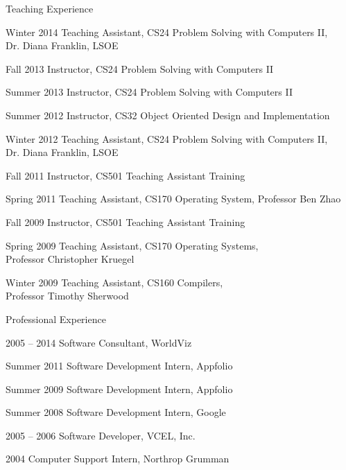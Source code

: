 \begin{vitae}
{\begin{vitaesection}{Teaching Experience}
\vspace{-0.1cm}
  \item [Winter 2014] Teaching Assistant, CS24 Problem Solving with Computers
    II,\\ Dr. Diana Franklin, LSOE
  \item [Fall 2013] Instructor, CS24 Problem Solving with Computers II
  \item [Summer 2013] Instructor, CS24 Problem Solving with Computers II
  \item [Summer 2012] Instructor, CS32 Object Oriented Design and
    Implementation
  \item [Winter 2012] Teaching Assistant, CS24 Problem Solving with Computers
    II,\\ Dr. Diana Franklin, LSOE
  \item [Fall 2011] Instructor, CS501 Teaching Assistant Training
  \item [Spring 2011] Teaching Assistant, CS170 Operating System, Professor Ben
    Zhao
  \item [Fall 2009] Instructor, CS501 Teaching Assistant Training
  \item [Spring 2009] Teaching Assistant, CS170 Operating Systems,\\
    Professor Christopher Kruegel
  \item [Winter 2009] Teaching Assistant, CS160 Compilers,\\
    Professor Timothy Sherwood
\end{vitaesection}

\begin{vitaesection}{Professional Experience}
\vspace{-0.1cm}
  \item [2005 -- 2014] Software Consultant, WorldViz
  \item [Summer 2011] Software Development Intern, Appfolio
  \item [Summer 2009] Software Development Intern, Appfolio
  \item [Summer 2008] Software Development Intern, Google
  \item [2005 -- 2006] Software Developer, VCEL, Inc.
  \item [2004] Computer Support Intern, Northrop Grumman
\end{vitaesection}

}
\end{vitae}
